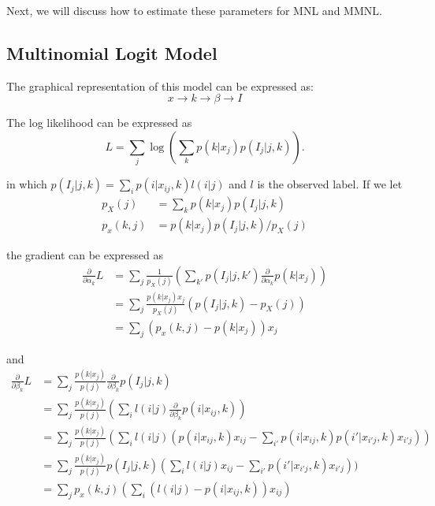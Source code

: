 \documentclass[english]{article}
\begin{document}
Next, we will discuss how to estimate these parameters for MNL and MMNL.

\subsection{Multinomial Logit Model}

The graphical representation of this model can be expressed as:
\begin{equation}\nonumber
  x \to k \to \beta \to I
\end{equation}

The log likelihood can be expressed as
\begin{equation}\nonumber
  L = \sum_j\log(\sum_kp(k|x_j)p(I_j|j,k)).
\end{equation}

\noindent in which $p(I_j|j,k) = \sum_ip(i|x_{ij},k)l(i|j)$ and $l$ is the observed label. If we let
\begin{equation}\nonumber
  \begin{aligned}
    p_X(j) & = \sum_kp(k|x_j)p(I_j|j,k)\\
    p_x(k,j) & = p(k|x_j)p(I_j|j,k) / p_X(j)
  \end{aligned}
\end{equation}

\noindent the gradient can be expressed as
\begin{equation}\nonumber
  \begin{aligned}
    \frac{\partial}{\partial \alpha_k}L & = \sum_j \frac{1}{p_X(j)}(\sum_{k'} p(I_j|j,k')\frac{\partial}{\partial \alpha_k}p(k|x_j)) \\
    & = \sum_j \frac{p(k|x_j)x_j}{p_X(j)}(p(I_j|j,k) - p_X(j))\\
    & = \sum_j (p_x(k,j) - p(k|x_j))x_j
  \end{aligned}
\end{equation}

\noindent and
\begin{equation}\nonumber
  \begin{aligned}
    \frac{\partial}{\partial \beta_k}L & = \sum_j \frac{p(k|x_j)}{p(j)}\frac{\partial}{\partial \beta_k}p(I_j|j,k) \\
    & = \sum_j \frac{p(k|x_j)}{p(j)}(\sum_il(i|j)\frac{\partial}{\partial \beta_k}p(i|x_{ij},k)) \\
    & = \sum_j \frac{p(k|x_j)}{p(j)}(\sum_il(i|j)(p(i|x_{ij},k)x_{ij}-\sum_{i'}p(i|x_{ij},k)p(i'|x_{i'j},k)x_{i'j})) \\
    & = \sum_j \frac{p(k|x_j)}{p(j)}p(I_j|j,k)(\sum_il(i|j)x_{ij}-\sum_{i'}p(i'|x_{i'j},k)x_{i'j})) \\
    & = \sum_j p_x(k,j)(\sum_i(l(i|j)-p(i|x_{ij},k))x_{ij})
  \end{aligned}
\end{equation}
\end{document}
